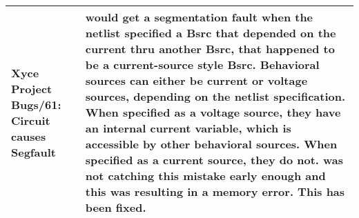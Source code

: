 {\begin{longtable}[h] {>{\raggedright\small}m{2in}|>{\raggedright\let\\\tabularnewline\small}m{3.5in}}
   \textbf{Xyce Project Bugs/61}: Circuit causes Segfault &
   \Xyce{} would get a segmentation fault when the netlist specified a Bsrc that depended on the current thru another Bsrc, that happened to be a current-source style Bsrc.  Behavioral sources can either be current or voltage sources, depending on the netlist specification.  When specified as a voltage source, they have an internal current variable, which is accessible by other behavioral sources.   When specified as a current source, they do not.  \Xyce{} was not catching this mistake early enough and this was resulting in a memory error.  This has been fixed. \\ \hline



\end{longtable}
}
